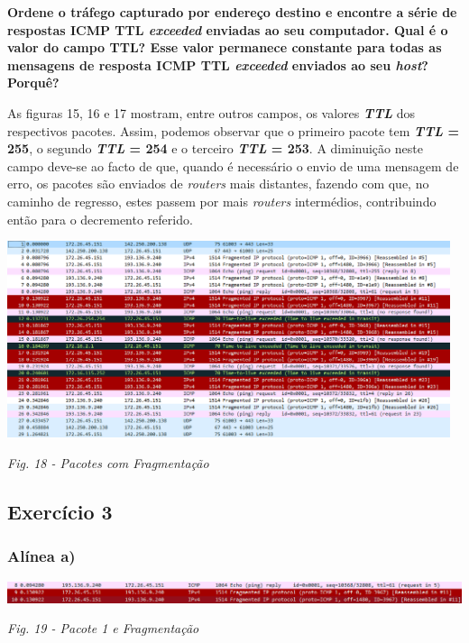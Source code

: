 \documentclass{article}
\begin{document}
\textbf{Ordene o tráfego capturado por endereço destino e encontre a série de respostas ICMP TTL \emph{exceeded} enviadas
ao seu computador. Qual é o valor do campo TTL? Esse valor permanece constante para todas as mensagens de
resposta ICMP TTL \emph{exceeded} enviados ao seu \emph{host}? Porquê?}\par\vspace{0.35cm}
\hspace{0.5cm}As figuras 15, 16 e 17 mostram, entre outros campos, os valores \emph{\textbf{TTL}} dos respectivos pacotes. Assim, podemos observar que o primeiro pacote tem \textbf{\emph{TTL} = 255}, o segundo \textbf{\emph{TTL} = 254} e o terceiro \textbf{\emph{TTL} = 253}. A diminuição neste campo deve-se ao facto de que, quando é necessário o envio de uma mensagem de erro, os pacotes são enviados de \emph{routers} mais distantes, fazendo com que, no caminho de regresso, estes passem por mais \emph{routers} intermédios, contribuindo então para o decremento referido.\par\clearpage

\begin{center}
\includegraphics[width=13cm]{awwd.png}\par\caption{\textit{Fig. 18 - Pacotes com Fragmentação}}
\end{center}
\subsection{Exercício 3}

\subsubsection{Alínea a)}
\begin{center}
\includegraphics[width=14cm]{pacote.png}\par\caption{\textit{Fig. 19 - Pacote 1 e Fragmentação}}\par\vspace{0.3cm}
\end{center}
\end{document}
